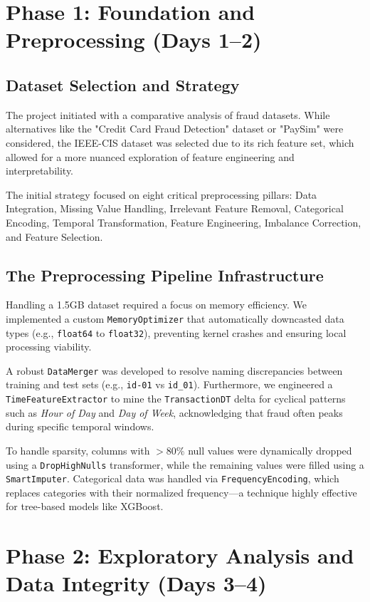 \documentclass[10pt,journal,compsoc,twocolumn]{IEEEtran}
\begin{document}
\section{Phase 1: Foundation and Preprocessing (Days 1--2)}

\subsection{Dataset Selection and Strategy}
The project initiated with a comparative analysis of fraud datasets. While alternatives like the "Credit Card Fraud Detection" dataset or "PaySim" were considered, the IEEE-CIS dataset was selected due to its rich feature set, which allowed for a more nuanced exploration of feature engineering and interpretability.

The initial strategy focused on eight critical preprocessing pillars: Data Integration, Missing Value Handling, Irrelevant Feature Removal, Categorical Encoding, Temporal Transformation, Feature Engineering, Imbalance Correction, and Feature Selection.

\subsection{The Preprocessing Pipeline Infrastructure}
Handling a 1.5GB dataset required a focus on memory efficiency. We implemented a custom \texttt{MemoryOptimizer} that automatically downcasted data types (e.g., \texttt{float64} to \texttt{float32}), preventing kernel crashes and ensuring local processing viability.

A robust \texttt{DataMerger} was developed to resolve naming discrepancies between training and test sets (e.g., \texttt{id-01} vs \texttt{id\_01}). Furthermore, we engineered a \texttt{TimeFeatureExtractor} to mine the \texttt{TransactionDT} delta for cyclical patterns such as \textit{Hour of Day} and \textit{Day of Week}, acknowledging that fraud often peaks during specific temporal windows.

To handle sparsity, columns with $>80\%$ null values were dynamically dropped using a \texttt{DropHighNulls} transformer, while the remaining values were filled using a \texttt{SmartImputer}. Categorical data was handled via \texttt{FrequencyEncoding}, which replaces categories with their normalized frequency—a technique highly effective for tree-based models like XGBoost.

\section{Phase 2: Exploratory Analysis and Data Integrity (Days 3--4)}
\end{document}
